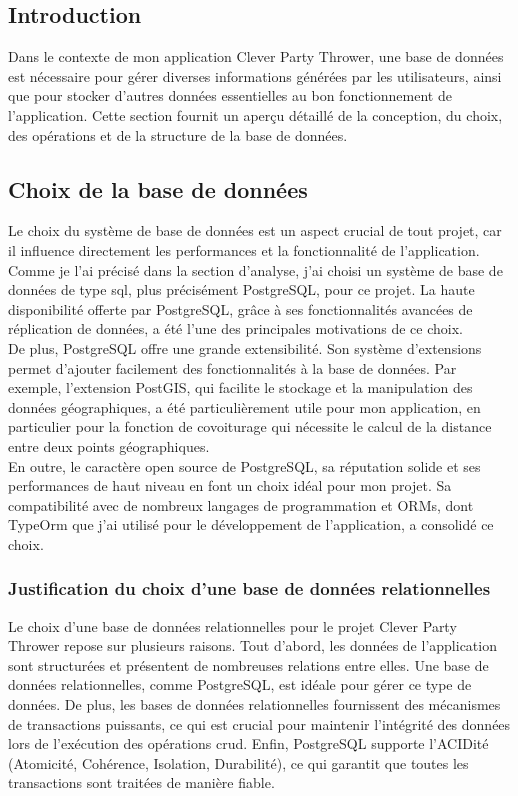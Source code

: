 \subsection{Introduction}\label{subsec:introduction_base_de_donnee}
Dans le contexte de mon application Clever Party Thrower, une base de données est nécessaire pour gérer diverses informations générées par les utilisateurs,
ainsi que pour stocker d'autres données essentielles au bon fonctionnement de l'application.
Cette section fournit un aperçu détaillé de la conception, du choix, des opérations et de la structure de la base de données.

\subsection{Choix de la base de données}\label{subsec:choix-de-la-base-de-donnee}
Le choix du système de base de données est un aspect crucial de tout projet, car il influence directement les performances et la fonctionnalité de l'application.
Comme je l'ai précisé dans la section d'analyse, j'ai choisi un système de base de données de type \Gls{sql}, plus précisément PostgreSQL, pour ce projet.
La haute disponibilité offerte par PostgreSQL, grâce à ses fonctionnalités avancées de réplication de données, a été l'une des principales motivations de ce choix.\\

De plus, PostgreSQL offre une grande extensibilité.
Son système d'extensions permet d'ajouter facilement des fonctionnalités à la base de données.
Par exemple, l'extension PostGIS, qui facilite le stockage et la manipulation des données géographiques, a été particulièrement utile pour mon application,
en particulier pour la fonction de covoiturage qui nécessite le calcul de la distance entre deux points géographiques.\\

En outre, le caractère open source de PostgreSQL, sa réputation solide et ses performances de haut niveau en font un choix idéal pour mon projet.
Sa compatibilité avec de nombreux langages de programmation et ORMs, dont TypeOrm que j'ai utilisé pour le développement de l'application, a consolidé ce choix.

\subsubsection{Justification du choix d'une base de données relationnelles}\label{subsubsec:justification-choix-relational-db}
Le choix d'une base de données relationnelles pour le projet Clever Party Thrower repose sur plusieurs raisons.
Tout d'abord, les données de l'application sont structurées et présentent de nombreuses relations entre elles.
Une base de données relationnelles, comme PostgreSQL, est idéale pour gérer ce type de données.
De plus, les bases de données relationnelles fournissent des mécanismes de transactions puissants, ce qui est crucial pour maintenir
l'intégrité des données lors de l'exécution des opérations \Gls{crud}. Enfin,
PostgreSQL supporte l'ACIDité (Atomicité, Cohérence, Isolation, Durabilité), ce qui garantit que toutes les transactions sont traitées de manière fiable.\\

